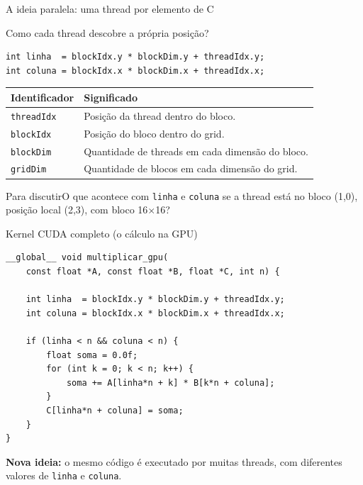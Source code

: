 \documentclass[aspectratio=169,11pt]{beamer}
\newcommand{\pergunta}[1]{\begin{alertblock}{Para discutir}#1\end{alertblock}}
\begin{document}
\begin{frame}{A ideia paralela: uma thread por elemento de C}
\centering
{}
\end{frame}

\begin{frame}[fragile]{Como cada thread descobre a própria posição?}
\begin{lstlisting}[style=prog]
int linha  = blockIdx.y * blockDim.y + threadIdx.y;
int coluna = blockIdx.x * blockDim.x + threadIdx.x;
\end{lstlisting}
\begin{tabular}{p{.24\linewidth}p{.68\linewidth}}
\toprule
\textbf{Identificador} & \textbf{Significado}\\
\midrule
\texttt{threadIdx} & Posição da thread dentro do bloco. \\
\texttt{blockIdx} & Posição do bloco dentro do grid. \\
\texttt{blockDim} & Quantidade de threads em cada dimensão do bloco. \\
\texttt{gridDim} & Quantidade de blocos em cada dimensão do grid. \\
\bottomrule
\end{tabular}
\vspace{3mm}
\pergunta{O que acontece com \texttt{linha} e \texttt{coluna} se a thread está no bloco (1,0), posição local (2,3), com bloco 16$\times$16?}
\end{frame}

\begin{frame}[fragile]{Kernel CUDA completo (o cálculo na GPU)}
\begin{lstlisting}[style=prog]
__global__ void multiplicar_gpu(
    const float *A, const float *B, float *C, int n) {

    int linha  = blockIdx.y * blockDim.y + threadIdx.y;
    int coluna = blockIdx.x * blockDim.x + threadIdx.x;

    if (linha < n && coluna < n) {
        float soma = 0.0f;
        for (int k = 0; k < n; k++) {
            soma += A[linha*n + k] * B[k*n + coluna];
        }
        C[linha*n + coluna] = soma;
    }
}
\end{lstlisting}
\small \textbf{Nova ideia:} o mesmo código é executado por muitas threads, com diferentes valores de \texttt{linha} e \texttt{coluna}.
\end{frame}
\end{document}
